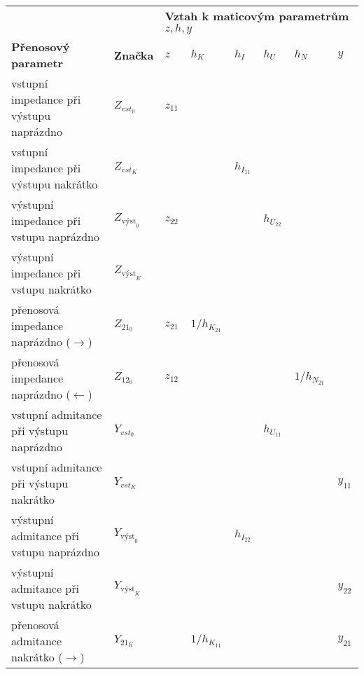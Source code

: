       \begin{table*}[!t]
        \centering
        \begin{tabular}{|l|l|l|l|l|l|l|l|}
          \hline
           &  & \multicolumn{6}{l|}{{\textbf{Vztah k maticovým parametrům} \(z, h, y\)}} \\ 
          \cline{3-8} 
          \multirow{-2}{*}{\textbf{Přenosový parametr}} & \multirow{-2}{*}{\textbf{Značka}} 
          & \(z\) & \(h_K\) & \(h_I\) & \(h_U\) & \(h_N\) & \(y\) \\ 
          \hline\hline
          vstupní impedance při výstupu naprázdno  
           & \(Z_{vst_0}\) 
                 & \(z_{11}\) & & & & &                      \\
          vstupní impedance při výstupu nakrátko  
           & \(Z_{vst_K}\) 
                 & & & \(h_{I_{11}}\) & & &                  \\
          výstupní impedance při vstupu naprázdno  
           & \(Z_{\text{výst}_0}\) 
                 & \(z_{22}\) & & & \(h_{U_{22}}\) & &       \\
          výstupní impedance při vstupu nakrátko   
           & \(Z_{\text{výst}_K}\) 
                 & & & & & &                                 \\
          přenosová impedance naprázdno (\(\rightarrow\))
           & \(Z_{21_0}\) 
                 & \(z_{21}\) & \(1/h_{K_{21}}\) & & & &     \\
          přenosová impedance naprázdno (\(\leftarrow\))
           & \(Z_{12_0}\) 
                 & \(z_{12}\) & & & & \(1/h_{N_{21}}\) &     \\
          vstupní admitance při výstupu naprázdno 
           & \(Y_{vst_0}\) 
                 & & & & \(h_{U_{11}}\)& &                   \\
          vstupní admitance při výstupu nakrátko  
           & \(Y_{vst_K}\) 
                 & & & & & & \(y_{11}\)                      \\
          výstupní admitance při vstupu naprázdno  
           & \(Y_{\text{výst}_0}\) 
                 & & & \(h_{I_{22}}\) & & &                  \\
          výstupní admitance při vstupu nakrátko  
           & \(Y_{\text{výst}_K}\) 
                 & & & & & & \(y_{22}\)                      \\
          přenosová admitance nakrátko (\(\rightarrow\))
           & \(Y_{21_K}\) 
                 & & \(1/h_{K_{11}}\) & & & & \(y_{21}\)     \\

\end{tabular}
\end{table*}
